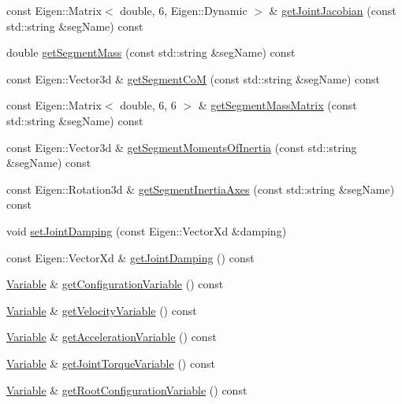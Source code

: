 \begin{DoxyCompactItemize}
\item 
const Eigen\+::\+Matrix$<$ double, 6, Eigen\+::\+Dynamic $>$ \& \hyperlink{classocra_1_1Model_ab90a0e86e7655d0b37ea61d89137b7f3}{get\+Joint\+Jacobian} (const std\+::string \&seg\+Name) const 
\item 
double \hyperlink{classocra_1_1Model_a99e56c7411002d9f82e79acb4be14ef1}{get\+Segment\+Mass} (const std\+::string \&seg\+Name) const 
\item 
const Eigen\+::\+Vector3d \& \hyperlink{classocra_1_1Model_a3f06fc0450236c0e15b41cba48af1038}{get\+Segment\+CoM} (const std\+::string \&seg\+Name) const 
\item 
const Eigen\+::\+Matrix$<$ double, 6, 6 $>$ \& \hyperlink{classocra_1_1Model_a03078f274f7e7be0694de69ab726ab2d}{get\+Segment\+Mass\+Matrix} (const std\+::string \&seg\+Name) const 
\item 
const Eigen\+::\+Vector3d \& \hyperlink{classocra_1_1Model_af83c4b16778ee019b3700627871ed140}{get\+Segment\+Moments\+Of\+Inertia} (const std\+::string \&seg\+Name) const 
\item 
const Eigen\+::\+Rotation3d \& \hyperlink{classocra_1_1Model_a49fe440f17e3264a586184ef55637afe}{get\+Segment\+Inertia\+Axes} (const std\+::string \&seg\+Name) const 
\item 
void \hyperlink{classocra_1_1Model_a14b26b592ba1fe5d01c2f10120e59bcc}{set\+Joint\+Damping} (const Eigen\+::\+Vector\+Xd \&damping)
\item 
const Eigen\+::\+Vector\+Xd \& \hyperlink{classocra_1_1Model_a5e692a1b25090f56312c458b55d7f60a}{get\+Joint\+Damping} () const 
\item 
\hyperlink{classocra_1_1Variable}{Variable} \& \hyperlink{classocra_1_1Model_a4bdf24ff6d1579f052ea0425ba956ff0}{get\+Configuration\+Variable} () const 
\item 
\hyperlink{classocra_1_1Variable}{Variable} \& \hyperlink{classocra_1_1Model_a0e41bf6c5af3be6d34b704d17ded8df2}{get\+Velocity\+Variable} () const 
\item 
\hyperlink{classocra_1_1Variable}{Variable} \& \hyperlink{classocra_1_1Model_a698c9b6f18db52039ef744bbf92ab4dd}{get\+Acceleration\+Variable} () const 
\item 
\hyperlink{classocra_1_1Variable}{Variable} \& \hyperlink{classocra_1_1Model_a0fc78bb5fc0dbafafb19fb6632cfb645}{get\+Joint\+Torque\+Variable} () const 
\item 
\hyperlink{classocra_1_1Variable}{Variable} \& \hyperlink{classocra_1_1Model_a8cea6d3df5911ba61c4553b91491487a}{get\+Root\+Configuration\+Variable} () const 

\end{DoxyCompactItemize}
